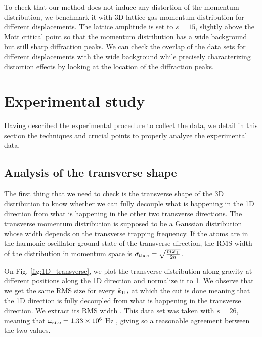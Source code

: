 To check that our method does not induce any distortion of the momentum distribution, we benchmark it with 3D lattice gas momentum distribution for different displacements. The lattice amplitude is set to $s=15$, \ie slightly above the Mott critical point so that the momentum distribution has a wide background but still sharp diffraction peaks. We can check the overlap of the data sets for different displacements with the wide background while precisely characterizing distortion effects by looking at the location of the diffraction peaks.


\section{Experimental study}

Having described the experimental procedure to collect the data, we detail in this section the techniques and crucial points to properly analyze the experimental data.

\subsection{Analysis of the transverse shape}

The first thing that we need to check is the transverse shape of the 3D distribution to know whether we can fully decouple what is happening in the 1D direction from what is happening in the other two transverse directions. The transverse momentum distribution is supposed to be a Gaussian distribution whose width depends on the transverse trapping frequency. If the atoms are in the harmonic oscillator ground state of the transverse direction, the RMS width of the distribution in momentum space is $\sigma_{\rm{theo}}=\sqrt{\frac{m \omega_{\perp}}{2 \hbar}}$. 

On Fig.-\ref{fig:1D_transverse}, we plot the transverse distribution along gravity at different positions along the 1D direction and normalize it to 1. We observe that we get the same RMS size for every $k_{\rm{1D}}$ at which the cut is done meaning that the 1D direction is fully decoupled from what is happening in the transverse direction. We extract its RMS width . This data set was taken with $s=26$, meaning that $\omega_{\rm{site}}=1.33 \times 10^6$ Hz , giving  so a reasonable agreement between the two values. 


